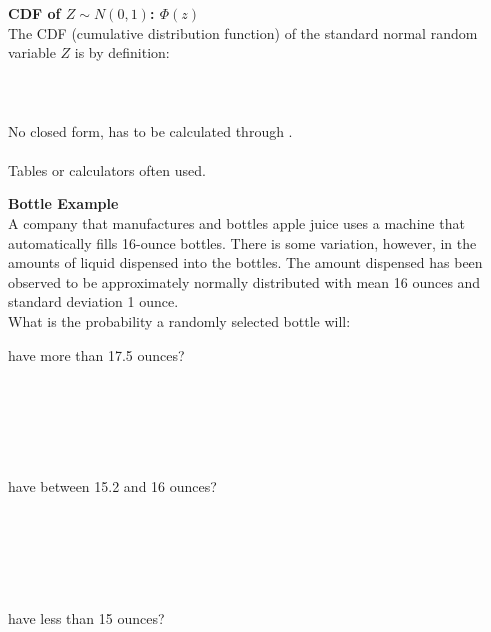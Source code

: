 \textbf{CDF of $Z \sim N(0, 1)$: $\Phi(z)$}\\
The CDF (cumulative distribution function) of the standard normal random variable $Z$ is by definition:\\~\\~\\~\\
No closed form, has to be calculated through  \underbar{~~~~~~~~~~~~~~~~~~~~~~~~~~~~~~~~~~~~~~~~~~~~~~~~~~~~} .\\~\\
Tables or calculators often used.

\pagebreak

\textbf{Bottle Example}\\
A company that manufactures and bottles apple juice uses a machine that automatically fills 16-ounce bottles.  There is some variation, however, in the amounts of liquid dispensed into the bottles.  The amount dispensed has been observed to be approximately normally distributed with mean 16 ounces and standard deviation 1 ounce. \\
What is the probability a randomly selected bottle will:
\bi
\item have more than 17.5 ounces?\\~\\~\\~\\~\\~\\
\item have between 15.2 and 16 ounces?\\~\\~\\~\\~\\~\\
\item have less than 15 ounces?\\~\\~\\~\\~\\~\\
\ei

\pagebreak

